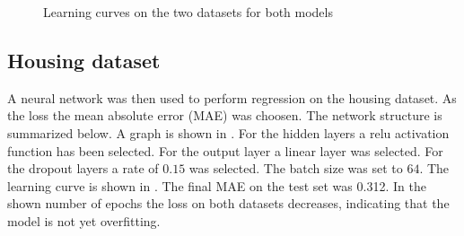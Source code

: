 \documentclass[12pt,a4paper]{scrartcl}
\begin{document}
	
		\begin{figure}[H]
		\centering	
		\caption{Learning curves on the two datasets for both models}
		\label{fig:ex3_3_learning_curves_early}
	\end{figure}

	\subsection*{Housing dataset}
	
	A neural network was then used to perform regression on the housing dataset. As the loss the mean absolute error (MAE) was choosen. The network structure is summarized below. 
	A graph is shown in . For the hidden layers a relu activation function has been selected. For the output layer a linear layer was selected.
	For the dropout layers a rate of $0.15$ was selected. The batch size was set to $64$. 
	The learning curve is shown in .
	The final MAE on the test set was \num{0.312}.
	In the shown number of epochs the loss on both datasets decreases, indicating that the model is not yet overfitting.
	
\end{document}
